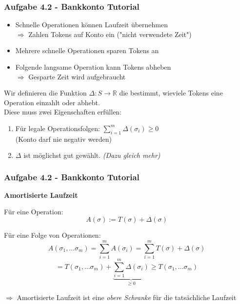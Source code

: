 \documentclass{beamer}
\begin{document}
\begin{frame}[t]
	\frametitle{Aufgabe 4.2 - Bankkonto Tutorial}

	\begin{itemize}
		\item Schnelle Operationen können Laufzeit übernehmen \\
		      $\Rightarrow$ Zahlen Tokens auf Konto ein ("nicht verwendete Zeit")
		\item Mehrere schnelle Operationen sparen Tokens an
		\item Folgende langsame Operation kann Tokens abheben \\
		      $\Rightarrow$ Gesparte Zeit wird aufgebraucht
	\end{itemize}

	\bigskip

	Wir definieren die Funktion $\Delta: S \to \mathbb{R}$ die bestimmt, wieviele Tokens eine Operation einzahlt oder abhebt. \\
	Diese muss zwei Eigenschaften erfüllen:

	\medskip

	\begin{enumerate}
		\item Für legale Operationsfolgen: $\sum_{i=1}^{m} \Delta(\sigma_i) \geq 0$ \\
		      (Konto darf nie negativ werden)
		\item $\Delta$ ist möglichst gut gewählt. \textit{(Dazu gleich mehr)}
	\end{enumerate}
\end{frame}

\begin{frame}
	\frametitle{Aufgabe 4.2 - Bankkonto Tutorial}

	\textbf{Amortisierte Laufzeit}

	\medskip

	Für eine Operation: \\
	$$A(\sigma) := T(\sigma) + \Delta(\sigma)$$

	Für eine Folge von Operationen: \\
	$$A(\sigma_1,\dots\sigma_m) = \sum_{i=1}^{m} A(\sigma_i) = \sum_{i=1}^{m} T(\sigma) + \Delta(\sigma)$$
	$$= T(\sigma_1,\dots\sigma_m) + \underbrace{\sum_{i=1}^{m} \Delta{(\sigma_i)}}_{\geq 0} \geq T(\sigma_1,\dots\sigma_m)$$

	$\Rightarrow$ Amortisierte Laufzeit ist eine \textit{obere Schranke} für die tatsächliche Laufzeit
\end{frame}
\end{document}
